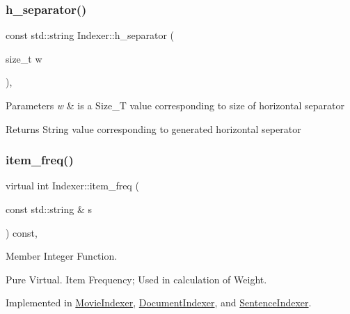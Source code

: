 \subsubsection{\texorpdfstring{h\+\_\+separator()}{h\_separator()}}
{\footnotesize\ttfamily const std\+::string Indexer\+::h\+\_\+separator (\begin{DoxyParamCaption}\item[{size\+\_\+t}]{w }\end{DoxyParamCaption})\hspace{0.3cm}{\ttfamily [static]}, {\ttfamily [protected]}}


\begin{DoxyParams}{Parameters}
{\em w} & is a Size\+\_\+T value corresponding to size of horizontal separator \\
\hline
\end{DoxyParams}
\begin{DoxyReturn}{Returns}
String value corresponding to generated horizontal seperator 
\end{DoxyReturn}
\mbox{\label{class_indexer_a9f9ea4d9946c531f257720cc9e9391eb}} 
\subsubsection{\texorpdfstring{item\+\_\+freq()}{item\_freq()}}
{\footnotesize\ttfamily virtual int Indexer\+::item\+\_\+freq (\begin{DoxyParamCaption}\item[{const std\+::string \&}]{s }\end{DoxyParamCaption}) const\hspace{0.3cm}{\ttfamily [protected]}, {}}



Member Integer Function. 

Pure Virtual. Item Frequency; Used in calculation of Weight. 

Implemented in \hyperlink{class_movie_indexer_ac19449df057ce8f16490bc42adab2b3c}{Movie\+Indexer}, \hyperlink{class_document_indexer_a302fed9a2c33a60bc7d9d7bcb03902fa}{Document\+Indexer}, and \hyperlink{class_sentence_indexer_a892b5cc701450698a04de74a3661928e}{Sentence\+Indexer}.

\mbox{\label{class_indexer_af71c69a4267217969f21cba44822f263}} 
